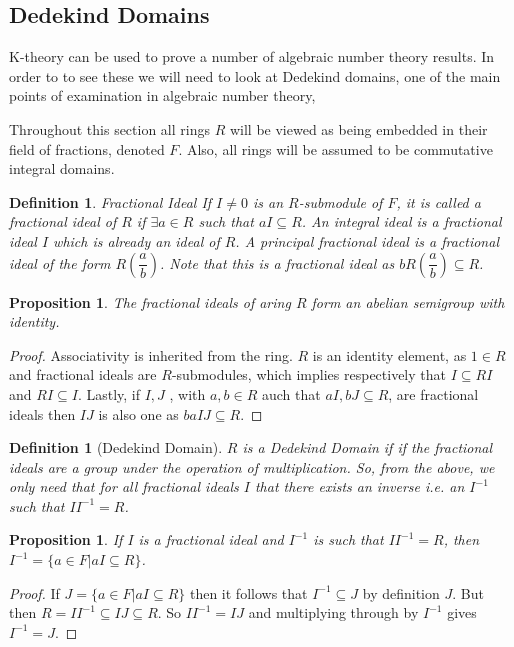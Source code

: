 \documentclass[a4paper,10pt]{article}
\newtheorem{prop}[thm]{Proposition}
\newtheorem{defn}[thm]{Definition}
\begin{document}
\subsection{Dedekind Domains}

K-theory can be used to prove a number of algebraic number theory results. In order to to see these we will need to look at Dedekind domains, one of the main points of examination in algebraic number theory,

Throughout this section all rings $R$ will be viewed as being embedded in their field of fractions, denoted $F$. Also, all rings will be assumed to be commutative integral domains.

\begin{defn}{Fractional Ideal}
If $I\neq 0$ is an $R$-submodule of $F$, it is called a fractional ideal of $R$ if $\exists a\in R$ such that $aI\subseteq R$.
\newline An integral ideal is a fractional ideal $I$ which is already an ideal of $R$.
\newline A principal fractional ideal is a fractional ideal of the form $R\left(\dfrac{a}{b}\right)$. Note that this is a fractional ideal as $bR\left(\dfrac{a}{b}\right)\subseteq R$.
\end{defn}

\begin{prop}
The fractional ideals of aring $R$ form an abelian semigroup with identity.
\end{prop}
\begin{proof}
Associativity is inherited from the ring.
\newline $R$ is an identity element, as $1\in R$ and fractional ideals are $R$-submodules, which implies respectively that $I\subseteq RI$ and $RI\subseteq I$. Lastly, if $I,J$ , with  $a,b\in R$ auch that $aI,bJ\subseteq R$, are fractional ideals then $IJ$ is also one as $baIJ\subseteq R$.
\end{proof}


\begin{defn}[Dedekind Domain]
$R$ is a Dedekind Domain if if the fractional ideals are a group under the operation of multiplication. So, from the above, we only need that for all fractional ideals $I$ that there exists an inverse i.e. an $I^{-1}$ such that $II^{-1}=R$.
\end{defn}

\begin{prop}
If $I$ is a fractional ideal and $I^{-1}$ is such that $II^{-1}=R$, then $I^{-1}=\{a\in F|aI\subseteq R\}$.
\end{prop}
\begin{proof}
If $J=\{a\in F|aI\subseteq R\}$ then it follows that $I^{-1}\subseteq J$  by definition $J$. But then $R=II^{-1}\subseteq IJ\subseteq R$. So $II^{-1}=IJ$ and multiplying through by $I^{-1}$ gives $I^{-1}=J$.
\end{proof}
\end{document}

